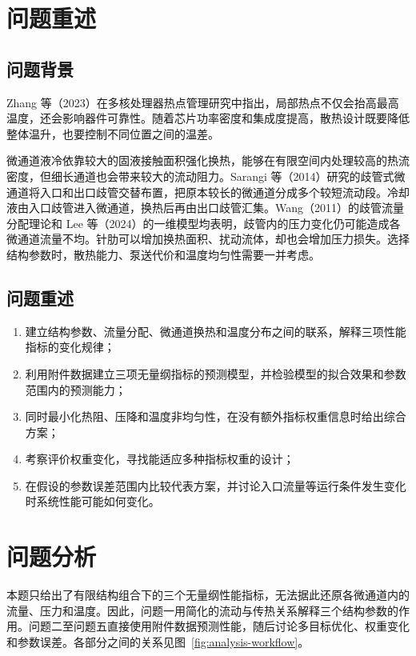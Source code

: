 \documentclass[withoutpreface,bwprint]{cumcmthesis}
\begin{document}
\section{问题重述}
\subsection{问题背景}
Zhang 等（2023）在多核处理器热点管理研究中指出，局部热点不仅会抬高最高温度，还会影响器件可靠性\cite{Zhang2023}。随着芯片功率密度和集成度提高，散热设计既要降低整体温升，也要控制不同位置之间的温差。

微通道液冷依靠较大的固液接触面积强化换热，能够在有限空间内处理较高的热流密度，但细长通道也会带来较大的流动阻力。Sarangi 等（2014）研究的歧管式微通道将入口和出口歧管交替布置，把原本较长的微通道分成多个较短流动段。冷却液由入口歧管进入微通道，换热后再由出口歧管汇集\cite{Sarangi2014}。Wang（2011）的歧管流量分配理论和 Lee 等（2024）的一维模型均表明，歧管内的压力变化仍可能造成各微通道流量不均\cite{Wang2011,Lee2024}。针肋可以增加换热面积、扰动流体，却也会增加压力损失。选择结构参数时，散热能力、泵送代价和温度均匀性需要一并考虑。

\subsection{问题重述}
\begin{enumerate}[label=\textbf{（\arabic*）},leftmargin=3.2em]
  \item 建立结构参数、流量分配、微通道换热和温度分布之间的联系，解释三项性能指标的变化规律；
  \item 利用附件数据建立三项无量纲指标的预测模型，并检验模型的拟合效果和参数范围内的预测能力；
  \item 同时最小化热阻、压降和温度非均匀性，在没有额外指标权重信息时给出综合方案；
  \item 考察评价权重变化，寻找能适应多种指标权重的设计；
  \item 在假设的参数误差范围内比较代表方案，并讨论入口流量等运行条件发生变化时系统性能可能如何变化。
\end{enumerate}

\section{问题分析}
本题只给出了有限结构组合下的三个无量纲性能指标，无法据此还原各微通道内的流量、压力和温度。因此，问题一用简化的流动与传热关系解释三个结构参数的作用。问题二至问题五直接使用附件数据预测性能，随后讨论多目标优化、权重变化和参数误差。各部分之间的关系见图~\ref{fig:analysis-workflow}。
\end{document}

